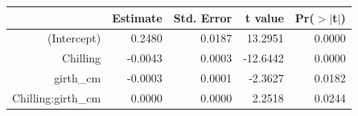 \begin{table}[ht]
\centering
\begin{tabular}{rrrrr}
  \hline
 & Estimate & Std. Error & t value & Pr($>$$|$t$|$) \\ 
  \hline
(Intercept) & 0.2480 & 0.0187 & 13.2951 & 0.0000 \\ 
  Chilling & -0.0043 & 0.0003 & -12.6442 & 0.0000 \\ 
  girth\_cm & -0.0003 & 0.0001 & -2.3627 & 0.0182 \\ 
  Chilling:girth\_cm & 0.0000 & 0.0000 & 2.2518 & 0.0244 \\ 
   \hline
\end{tabular}
\end{table}

